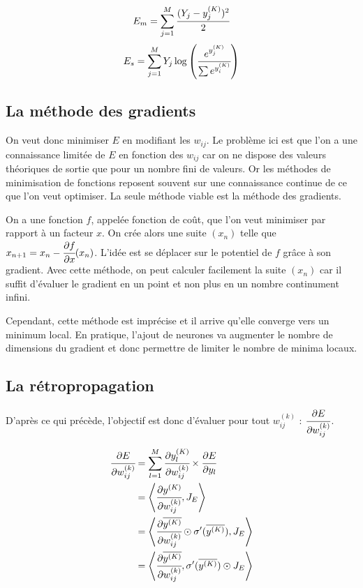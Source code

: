 \[E_m = \sum_{j = 1}^{M} \cfrac{(Y_j - y_j^{(K)})^2}{2}\]
\[E_s = \sum_{j = 1}^{M} Y_j \log \left(\cfrac{e^{y_j^{(K)}}}{\sum e^{y_i^{(K)}}}\right)\]

\subsection{La méthode des gradients}

On veut donc minimiser $E$ en modifiant les $w_{ij}$. Le problème ici est que
l'on a une connaissance limitée de $E$ en fonction des $w_{ij}$ car on ne
dispose des valeurs théoriques de sortie que pour un nombre fini de valeurs. Or
les méthodes de minimisation de fonctions reposent souvent sur une connaissance
continue de ce que l'on veut optimiser. La seule méthode viable est la méthode
des gradients.

\medskip

On a une fonction $f$, appelée fonction de coût, que l'on veut minimiser par
rapport à un facteur $x$. On crée alors une suite $(x_n)$ telle que
$x_{n+1} = x_{n} - \cfrac{\partial f}{\partial x}(x_n)$.
L'idée est se déplacer sur le potentiel de $f$ grâce à son gradient. Avec cette
méthode, on peut calculer facilement la suite $(x_n)$ car il suffit d'évaluer
le gradient en un point et non plus en un nombre continument infini.

\medskip

Cependant, cette méthode est imprécise et il arrive qu'elle converge vers un
minimum local. En pratique, l'ajout de neurones va augmenter le nombre de
dimensions du gradient et donc permettre de limiter le nombre de minima locaux.

\medskip

\subsection{La rétropropagation}

D'après ce qui précède, l'objectif est donc d'évaluer pour tout $w_{ij}^{(k)}$ :
 $\cfrac{\partial E}{\partial w_{ij}^{(k)}}$.

\begin{align*}
\cfrac{\partial E}{\partial w_{ij}^{(k)}} &= \sum_{l = 1}^{M} \cfrac{\partial y_l^{(K)}}{\partial w_{ij}^{(k)}} \times \cfrac{\partial E}{\partial y_l}\\
&= \left\langle\cfrac{\partial y^{(K)}}{\partial w_{ij}^{(k)}}, J_E\right\rangle\\
&= \left\langle\cfrac{\partial \overline{y^{(K)}}}{\partial w_{ij}^{(k)}} \odot \sigma'(\overline{y^{(K)}}), J_E\right\rangle \\
&= \left\langle\cfrac{\partial \overline{y^{(K)}}}{\partial w_{ij}^{(k)}} ,\sigma'(\overline{y^{(K)}}) \odot J_E\right\rangle
\end{align*}

